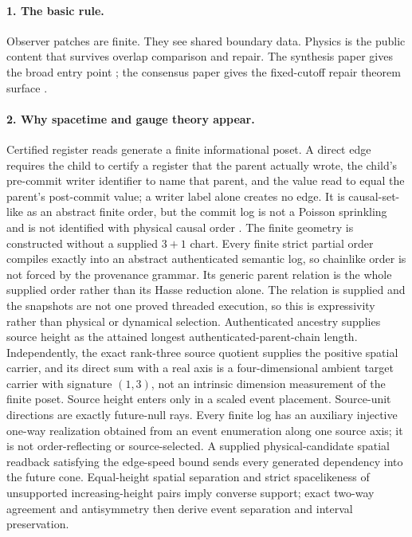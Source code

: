 \documentclass[11pt]{article}
\theoremstyle{remark}
\theoremstyle{plain}
\begin{document}
\paragraph{1. The basic rule.}
Observer patches are finite. They see shared boundary data. Physics is the public content that
survives overlap comparison and repair. The synthesis paper gives the broad entry point
\cite{OPHObserversAllYouNeed}; the consensus paper gives the fixed-cutoff repair theorem surface
\cite{OPHRealityConsensus}.

\paragraph{2. Why spacetime and gauge theory appear.}
Certified register reads generate a finite informational poset. A direct edge
requires the child to certify a register that the parent actually wrote, the
child's pre-commit writer identifier to name that parent, and the value read
to equal the parent's post-commit value; a writer label alone creates no edge. It is
causal-set-like as an abstract finite order, but the commit log is not a
Poisson sprinkling and is not identified with physical causal order
\cite{BombelliCausalSet,BombelliMeyerLorentzian,MajorRideoutSuryaTopology,
BombelliHensonSorkinSprinkling,SuryaCausalSet}. The finite geometry is
constructed without a supplied $3+1$ chart. Every finite strict partial order
compiles exactly into an abstract authenticated semantic log, so chainlike
order is not forced by the provenance grammar. Its generic parent relation is
the whole supplied order rather than its Hasse reduction alone. The relation is supplied and
the snapshots are not one proved threaded execution, so this is expressivity
rather than physical or dynamical selection. Authenticated ancestry supplies
source height as the attained longest authenticated-parent-chain length.
Independently, the exact rank-three source quotient
supplies the positive spatial carrier, and its direct sum with a real axis is a four-dimensional ambient target carrier
with signature \((1,3)\), not an intrinsic dimension measurement of the finite poset.
Source height enters only in a scaled event placement. Source-unit directions
are exactly future-null rays. Every finite log has an auxiliary injective
one-way realization obtained from an event enumeration along one source axis;
it is not order-reflecting or source-selected. A supplied physical-candidate spatial
readback satisfying the edge-speed bound sends every generated dependency
into the future cone. Equal-height spatial separation and strict spacelikeness
of unsupported increasing-height pairs imply converse support; exact two-way
agreement and antisymmetry then derive
event separation and interval preservation.
\end{document}
